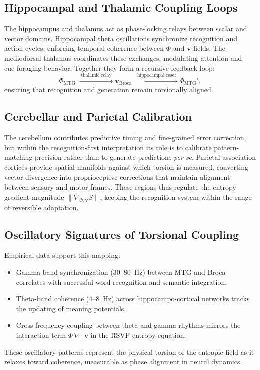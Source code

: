 \documentclass[11pt]{article}
\begin{document}
\subsection{Hippocampal and Thalamic Coupling Loops}
The hippocampus and thalamus act as phase-locking relays between scalar and vector domains. Hippocampal theta oscillations synchronize recognition and action cycles, enforcing temporal coherence between $\Phi$ and $\mathbf{v}$ fields. The mediodorsal thalamus coordinates these exchanges, modulating attention and cue-foraging behavior. Together they form a recursive feedback loop:
\[
\Phi_{\mathrm{MTG}}
\;\xrightarrow{\;\text{thalamic relay}\;}
\mathbf{v}_{\mathrm{Broca}}
\;\xrightarrow{\;\text{hippocampal reset}\;}
\Phi_{\mathrm{MTG}}',
\]
ensuring that recognition and generation remain torsionally aligned.

\subsection{Cerebellar and Parietal Calibration}
The cerebellum contributes predictive timing and fine-grained error correction, but within the recognition-first interpretation its role is to calibrate pattern-matching precision rather than to generate predictions \emph{per se}. Parietal association cortices provide spatial manifolds against which torsion is measured, converting vector divergence into proprioceptive corrections that maintain alignment between sensory and motor frames. These regions thus regulate the entropy gradient magnitude $\|\nabla_{\!\Phi,\mathbf{v}} S\|$, keeping the recognition system within the range of reversible adaptation.

\subsection{Oscillatory Signatures of Torsional Coupling}
Empirical data support this mapping:
\begin{itemize}
\item Gamma-band synchronization ($30$--$80$~Hz) between MTG and Broca correlates with successful word recognition and semantic integration.
\item Theta-band coherence ($4$--$8$~Hz) across hippocampo-cortical networks tracks the updating of meaning potentials.
\item Cross-frequency coupling between theta and gamma rhythms mirrors the interaction term $\Phi\,\nabla\!\cdot\!\mathbf{v}$ in the RSVP entropy equation.
\end{itemize}
These oscillatory patterns represent the physical torsion of the entropic field as it relaxes toward coherence, measurable as phase alignment in neural dynamics.
\end{document}
